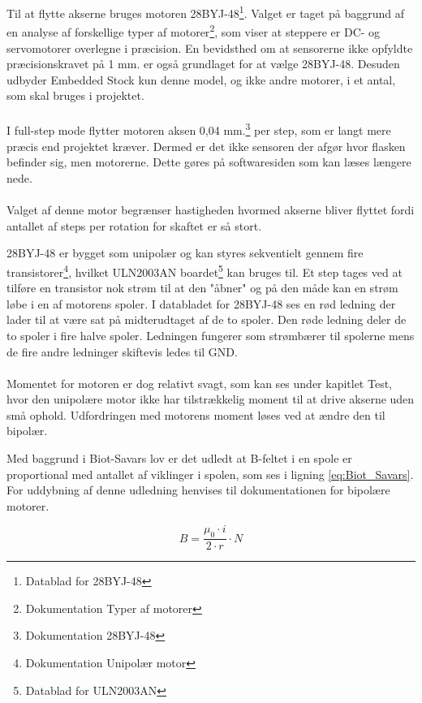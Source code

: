 Til at flytte akserne bruges motoren 28BYJ-48\footnote{Datablad for 28BYJ-48}. Valget er taget på baggrund af en analyse af forskellige typer af motorer\footnote{Dokumentation Typer af motorer}, som viser at steppere er DC- og servomotorer overlegne i præcision. En bevidsthed om at sensorerne ikke opfyldte præcisionskravet på 1 mm. er også grundlaget for at vælge 28BYJ-48. Desuden udbyder Embedded Stock kun denne model, og ikke andre motorer, i et antal, som skal bruges i projektet.
\\
\\
I full-step mode flytter motoren aksen 0,04 mm.\footnote{Dokumentation 28BYJ-48} per step, som er langt mere præcis end projektet kræver. Dermed er det ikke sensoren der afgør hvor flasken befinder sig, men motorerne. Dette gøres på softwaresiden som kan læses længere nede.
\\
\\
Valget af denne motor begrænser hastigheden hvormed akserne bliver flyttet fordi antallet af steps per rotation for skaftet er så stort.

28BYJ-48 er bygget som unipolær og kan styres sekventielt gennem fire transistorer\footnote{Dokumentation Unipolær motor}, hvilket ULN2003AN boardet\footnote{Datablad for ULN2003AN} kan bruges til. Et step tages ved at tilføre en transistor nok strøm til at den "åbner" og på den måde kan en strøm løbe i en af motorens spoler. I databladet for 28BYJ-48 ses en rød ledning der lader til at være sat på midterudtaget af de to spoler. Den røde ledning deler de to spoler i fire halve spoler. Ledningen fungerer som strømbærer til spolerne mens de fire andre ledninger skiftevis ledes til GND.
\\
\\
Momentet for motoren er dog relativt svagt, som kan ses under kapitlet Test, hvor den unipolære motor ikke har tilstrækkelig moment til at drive akserne uden små ophold. Udfordringen med motorens moment løses ved at ændre den til bipolær.

Med baggrund i Biot-Savars lov er det udledt at B-feltet i en spole er proportional med antallet af viklinger i spolen, som ses i ligning \ref{eq:Biot_Savars}. For uddybning af denne udledning henvises til dokumentationen for bipolære motorer.

\begin{equation} \label{eq:Biot_Savars}
	B = \frac{\mu_0 \cdot i}{2 \cdot r} \cdot N
\end{equation}

